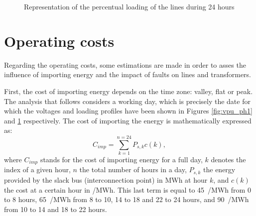 \begin{figure}[!htb]\centering
{}
    \caption{Representation of the percentual loading of the lines during 24 hours}
    \label{fig:lines_ph1}
  \end{figure}


\clearpage
\newpage

\section{Operating costs}
Regarding the operating costs, some estimations are made in order to asses the influence of importing energy and the impact of faults on lines and transformers. 

First, the cost of importing energy depends on the time zone: valley, flat or peak. The analysis that follows considers a working day, which is precisely the date for which the voltages and loading profiles have been shown in Figures \ref{fig:vpu_ph1} and \ref{fig:lines_ph1} respectively. The cost of importing the energy is mathematically expressed as:
\begin{equation}
  C_{imp} = \sum_{k=1}^{n=24}P_{s,k} c(k),
  \label{eq:cimp}
\end{equation}
where $C_{imp}$ stands for the cost of importing energy for a full day, $k$ denotes the index of a given hour, $n$ the total number of hours in a day, $P_{s,k}$ the energy provided by the slack bus (interconnection point) in MWh at hour $k$, and $c(k)$ the cost at a certain hour in \texteuro/MWh. This last term is equal to 45~\texteuro/MWh from 0 to 8 hours, 65~\texteuro/MWh from 8 to 10, 14 to 18 and 22 to 24 hours, and 90~\texteuro/MWh from 10 to 14 and 18 to 22 hours. 

